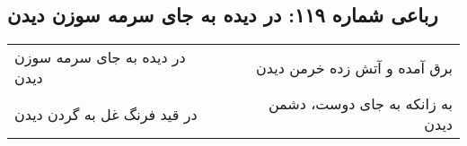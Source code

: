 \begin{center}
\section*{رباعی شماره ۱۱۹: در دیده به جای سرمه سوزن دیدن}
\label{sec:119}
\begin{longtable}{l p{0.5cm} r}
در دیده به جای سرمه سوزن دیدن
&&
برق آمده و آتش زده خرمن دیدن
\\
در قید فرنگ غل به گردن دیدن
&&
به زانکه به جای دوست، دشمن دیدن
\\
\end{longtable}
\end{center}
